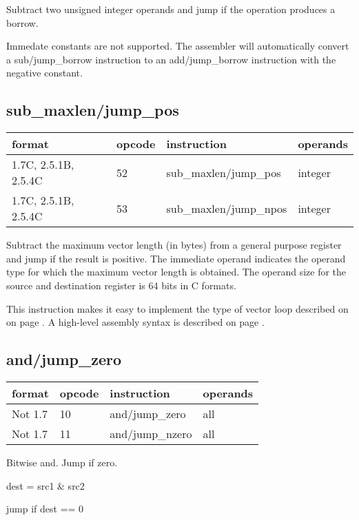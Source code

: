 \documentclass[forwardcom.tex]{subfiles}
\begin{document}
Subtract two unsigned integer operands and jump if the operation produces a borrow.
\vv

Immedate constants are not supported. The assembler will automatically convert a sub/jump\_borrow instruction to an add/jump\_borrow instruction with the negative constant.
\vv

\subsection{sub\_maxlen/jump\_pos}
\label{table:subMaxlenJumpPosInstruction}
\begin{tabular}{|p{24mm}|p{12mm}|p{52mm}|p{50mm}|}
\hline
\bfseries format & \bfseries opcode & \bfseries instruction & \bfseries operands \\ \hline
1.7C, 2.5.1B, 2.5.4C & 52 & sub\_maxlen/jump\_pos & integer \\ \hline
1.7C, 2.5.1B, 2.5.4C & 53 & sub\_maxlen/jump\_npos & integer \\ \hline
\end{tabular}
\vv

Subtract the maximum vector length (in bytes) from a general purpose register and jump if the result is positive.
The immediate operand indicates the operand type for which the maximum vector length is obtained. The operand size for the source and destination register is 64 bits in C formats.
\vv

This instruction makes it easy to implement the type of vector loop described on on page \pageref{vectorLoops}. A high-level assembly syntax is described on page \pageref{vectorLoopSyntax}.
\vv


\subsection{and/jump\_zero}
\label{table:andJumpZeroInstruction}
\begin{tabular}{|p{16mm}|p{12mm}|p{60mm}|p{50mm}|}
\hline
\bfseries format & \bfseries opcode & \bfseries instruction & \bfseries operands \\ \hline
Not 1.7 & 10 & and/jump\_zero & all \\ \hline
Not 1.7 & 11 & and/jump\_nzero & all \\ \hline
\end{tabular}
\vv

Bitwise and. Jump if zero.
\vv

dest = src1 \& src2

jump if dest == 0
\vv
\end{document}
